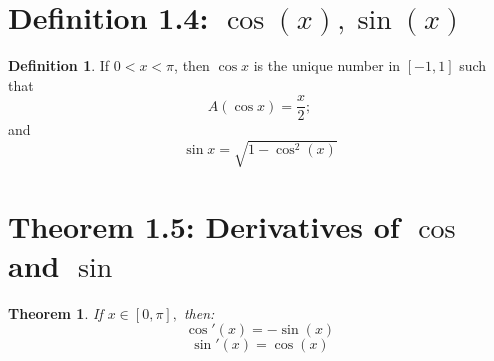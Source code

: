 \documentclass[openany, amssymb, psamsfonts]{amsart}
\newtheorem{thm}{Theorem}[section]
\theoremstyle{definition}
\newtheorem{defn}{Definition}[section]
\numberwithin{equation}{section}
\begin{document}
\section*{Definition 1.4: $\cos(x),\sin(x)$}
\begin{defn}
If $0 < x < \pi$, then $\cos x$ is the unique number in $[ -1, 1]$ such that
\[A (\cos x) =\frac{x}{2};\]
and
\[\sin x =\sqrt{1-\cos^2(x)}\]
\end{defn}

\section*{Theorem 1.5: Derivatives of $\cos$ and $\sin$}
\begin{thm}
If $x\in [0,\pi],$ then:
\[\cos'(x) = -\sin(x)\]
\[\sin'(x) = \cos(x)\]
\end{thm}
\end{document}
